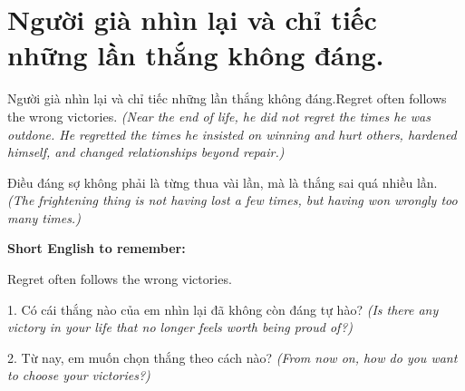 \section{Người già nhìn lại và chỉ tiếc những lần thắng không đáng.}
\begin{truyen}{Người già nhìn lại và chỉ tiếc những lần thắng không đáng.}{Regret often follows the wrong victories.}
\textit{(Near the end of life, he did not regret the times he was outdone. He regretted the times he insisted on winning and hurt others, hardened himself, and changed relationships beyond repair.)}
\end{truyen}
\begin{baihoc}
Điều đáng sợ không phải là từng thua vài lần, mà là thắng sai quá nhiều lần.
\textit{(The frightening thing is not having lost a few times, but having won wrongly too many times.)}
\end{baihoc}
\begin{ghinhoanh}\textbf{Short English to remember:}

Regret often follows the wrong victories.
\end{ghinhoanh}
\begin{tuhocnhanh}
1. Có cái thắng nào của em nhìn lại đã không còn đáng tự hào? \textit{(Is there any victory in your life that no longer feels worth being proud of?)}

2. Từ nay, em muốn chọn thắng theo cách nào? \textit{(From now on, how do you want to choose your victories?)}
\end{tuhocnhanh}
\ngancach